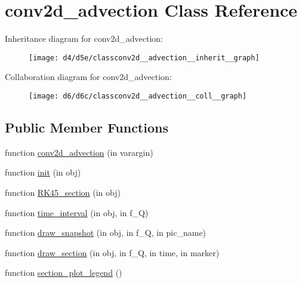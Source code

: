 \hypertarget{classconv2d__advection}{}\section{conv2d\+\_\+advection Class Reference}
\label{classconv2d__advection}


Inheritance diagram for conv2d\+\_\+advection\+:
\nopagebreak
\begin{figure}[H]
\begin{center}
\leavevmode
\texttt{[image: d4/d5e/classconv2d\_\_advection\_\_inherit\_\_graph]}
\end{center}
\end{figure}


Collaboration diagram for conv2d\+\_\+advection\+:
\nopagebreak
\begin{figure}[H]
\begin{center}
\leavevmode
\texttt{[image: d6/d6c/classconv2d\_\_advection\_\_coll\_\_graph]}
\end{center}
\end{figure}
\subsection*{Public Member Functions}
\begin{DoxyCompactItemize}
\item 
function \hyperlink{classconv2d__advection_af9701d710178f870edd4d4012ad6dbef}{conv2d\+\_\+advection} (in varargin)
\item 
function \hyperlink{classconv2d__advection_a3c93d4589fb6d8bec90dc2384faa9a90}{init} (in obj)
\item 
function \hyperlink{classconv2d__advection_a48f3233b9a9c94bb14a540998cd80317}{R\+K45\+\_\+section} (in obj)
\item 
function \hyperlink{classconv2d__advection_aae6fdf4e415147d33d082fbeaaaa779f}{time\+\_\+interval} (in obj, in f\+\_\+Q)
\item 
function \hyperlink{classconv2d__advection_a1f27cb85e26bf6d3811aebf609176e3f}{draw\+\_\+snapshot} (in obj, in f\+\_\+Q, in pic\+\_\+name)
\item 
function \hyperlink{classconv2d__advection_a651162bb43f5341806e841b03887c004}{draw\+\_\+section} (in obj, in f\+\_\+Q, in time, in marker)
\item 
function \hyperlink{classconv2d__advection_a2cb99381ebdc2638f02d5562bd091fca}{section\+\_\+plot\+\_\+legend} ()
\end{DoxyCompactItemize}
